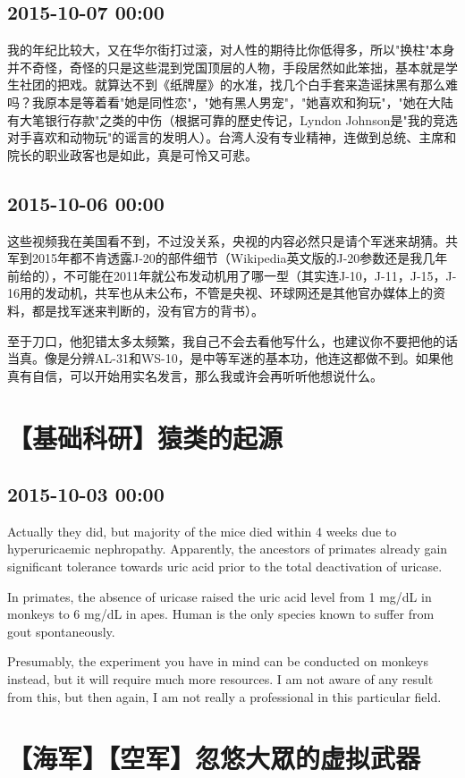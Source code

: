 \documentclass[twocolumn]{ctexart}
\begin{document}
\subsection*{2015-10-07 00:00}
我的年纪比较大，又在华尔街打过滚，对人性的期待比你低得多，所以"换柱"本身并不奇怪，奇怪的只是这些混到党国顶层的人物，手段居然如此笨拙，基本就是学生社团的把戏。就算达不到《纸牌屋》的水准，找几个白手套来造谣抹黑有那么难吗？我原本是等着看"她是同性恋"，"她有黑人男宠"，"她喜欢和狗玩"，"她在大陆有大笔银行存款"之类的中伤（根据可靠的歷史传记，Lyndon Johnson是"我的竞选对手喜欢和动物玩"的谣言的发明人）。台湾人没有专业精神，连做到总统、主席和院长的职业政客也是如此，真是可怜又可悲。\subsection*{2015-10-06 00:00}
这些视频我在美国看不到，不过没关系，央视的内容必然只是请个军迷来胡猜。共军到2015年都不肯透露J-20的部件细节（Wikipedia英文版的J-20参数还是我几年前给的），不可能在2011年就公布发动机用了哪一型（其实连J-10，J-11，J-15，J-16用的发动机，共军也从未公布，不管是央视、环球网还是其他官办媒体上的资料，都是找军迷来判断的，没有官方的背书）。

至于刀口，他犯错太多太频繁，我自己不会去看他写什么，也建议你不要把他的话当真。像是分辨AL-31和WS-10，是中等军迷的基本功，他连这都做不到。如果他真有自信，可以开始用实名发言，那么我或许会再听听他想说什么。\section*{【基础科研】猿类的起源}
\subsection*{2015-10-03 00:00}
Actually they did, but majority of the mice died within 4 weeks due to hyperuricaemic nephropathy. Apparently, the ancestors of primates already gain significant tolerance towards uric acid prior to the total deactivation of uricase.

In primates, the absence of uricase raised the uric acid level from 1 mg/dL in monkeys to 6 mg/dL in apes. Human is the only species known to suffer from gout spontaneously.

Presumably, the experiment you have in mind can be conducted on monkeys instead, but it will require much more resources. I am not aware of any result from this, but then again, I am not really a professional in this particular field.
\section*{【海军】【空军】忽悠大眾的虚拟武器}
\end{document}
